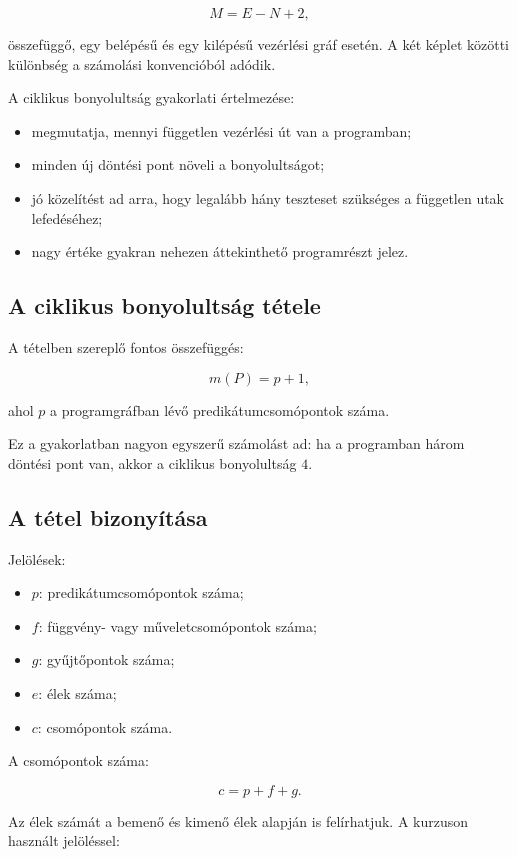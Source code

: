 \[
M=E-N+2,
\]

összefüggő, egy belépésű és egy kilépésű vezérlési gráf esetén. A két képlet közötti különbség a számolási konvencióból adódik.

A ciklikus bonyolultság gyakorlati értelmezése:

\begin{itemize}
  \item megmutatja, mennyi független vezérlési út van a programban;
  \item minden új döntési pont növeli a bonyolultságot;
  \item jó közelítést ad arra, hogy legalább hány teszteset szükséges a független utak lefedéséhez;
  \item nagy értéke gyakran nehezen áttekinthető programrészt jelez.
\end{itemize}

\subsection{A ciklikus bonyolultság tétele}

A tételben szereplő fontos összefüggés:

\[
m(P)=p+1,
\]

ahol $p$ a programgráfban lévő predikátumcsomópontok száma.

Ez a gyakorlatban nagyon egyszerű számolást ad: ha a programban három döntési pont van, akkor a ciklikus bonyolultság $4$.

\subsection{A tétel bizonyítása}

Jelölések:

\begin{itemize}
  \item $p$: predikátumcsomópontok száma;
  \item $f$: függvény- vagy műveletcsomópontok száma;
  \item $g$: gyűjtőpontok száma;
  \item $e$: élek száma;
  \item $c$: csomópontok száma.
\end{itemize}

A csomópontok száma:

\[
c=p+f+g.
\]

Az élek számát a bemenő és kimenő élek alapján is felírhatjuk. A kurzuson használt jelöléssel:

